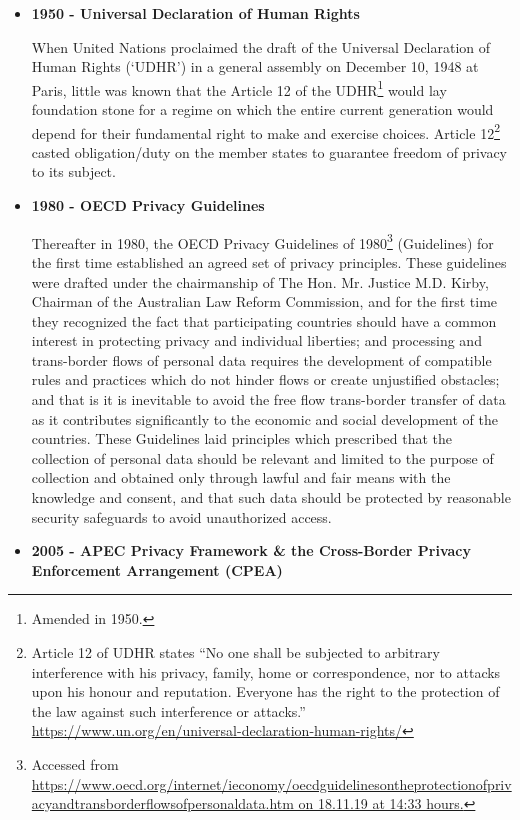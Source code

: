 \begin{multicols}{2}
\begin{itemize}

\item[{\bf 1.}] \textbf{1950 - Universal Declaration of Human Rights}

When United Nations proclaimed the draft of the Universal Declaration of Human Rights (‘UDHR’) in a general assembly on December 10, 1948 at Paris, little was known that the Article 12 of the UDHR\footnote{Amended in 1950.} would lay foundation stone for a regime on which the entire current generation would depend for their fundamental right to make and exercise choices. Article 12\footnote{Article 12 of UDHR states “No one shall be subjected to arbitrary interference with his privacy, family, home or correspondence, nor to attacks upon his honour and reputation. Everyone has the right to the protection of the law against such interference or attacks.” \url{https://www.un.org/en/universal-declaration-human-rights/}} casted obligation/duty on the member states to guarantee freedom of privacy to its subject.

\item[{\bf 2.}] \textbf{1980 - OECD Privacy Guidelines}

Thereafter in 1980, the OECD Privacy Guidelines of 1980\footnote{Accessed from \url{https://www.oecd.org/internet/ieconomy/oecdguidelinesontheprotectionofprivacyandtransborderflowsofpersonaldata.htm on 18.11.19 at 14:33 hours.}} (Guidelines) for the first time established an agreed set of privacy principles. These guidelines were drafted under the chairmanship of The Hon. Mr. Justice M.D. Kirby, Chairman of the Australian Law Reform Commission, and for the first time they recognized the fact that participating countries should have a common interest in protecting privacy and individual liberties; and processing and trans-border flows of personal data requires the development of compatible rules and practices which do not hinder flows or create unjustified obstacles; and that is it is inevitable to avoid the free flow trans-border transfer of data as it contributes significantly to the economic and social development of the countries. These Guidelines laid principles which prescribed that the collection of personal data should be relevant and limited to the purpose of collection and obtained only through lawful and fair means with the knowledge and consent, and that such data should be protected by reasonable security safeguards to avoid unauthorized access. 

\item[{\bf 3.}] \textbf{2005 - APEC Privacy Framework \& the Cross-Border Privacy Enforcement Arrangement (CPEA)}


\end{itemize}
\end{multicols}
